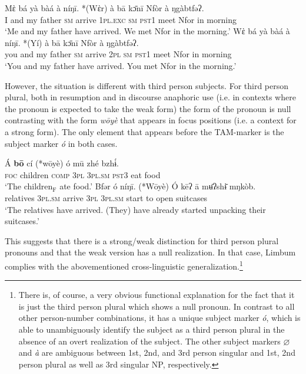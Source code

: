 \documentclass[output=paper]{langscibook}
\begin{document}
\ea\label{ex:johanneshein:discourseanaphora}
\begin{xlist}
\ex 
\gll Mὲ bá yà bàá à níŋī. *(Wὲr) à bā kɔ̄nī Nfòr à ŋgàbtfəʔ.\\
I and my father \textsc{sm} arrive \hphantom{*(}\textsc{1pl.exc} \textsc{sm} \textsc{pst1} meet Nfor in morning\\
\glt `Me and my father have arrived. We met Nfor in the morning.'
\ex 
\gll Wὲ bá yà bàá à níŋī. *(Yí) à bā kɔ̄nī Nfòr à ŋgàbtfəʔ.\\
you and my father \textsc{sm} arrive \hphantom{*(}\textsc{2pl} \textsc{sm} \textsc{pst1} meet Nfor in morning\\
\glt `You and my father have arrived. You met Nfor in the morning.'
\end{xlist}
\z
However, the situation is different with third person subjects. 
For third person plural, both in
resumption  and in discourse anaphoric use  (i.e. in contexts where the pronoun is expected to take the weak form) the form
of the pronoun is null contrasting with the form \textit{wōyè} that appears in focus positions (i.e. a context for a strong form). The only element that appears before the
TAM-marker is the subject marker \textit{ó} in both cases.

\ea
\begin{xlist}
\ex \label{ex:johanneshein:3rdpluralresumption}
\gll Á \textbf{bō} cí (*wōyè) ó mū zhé bzhɨ́.\\
\textsc{foc} children \textsc{comp} \hphantom{(*}\textsc{3pl} \textsc{3pl.sm} \textsc{pst3} eat food\\
\glt `The children$_{\text{F}}$ ate food.'
\ex \label{ex:johanneshein:3rdpluraldiscourse}
\gll Bfər ó níŋī. (*Wōyè) Ó kēʔ ā mʉ̄ʔshɨ̄ mŋkòb.\\
relatives \textsc{3pl.sm} arrive \hphantom{(*}\textsc{3pl} \textsc{3pl.sm} start to open suitcases\\
\glt `The relatives have arrived. (They) have already started unpacking their suitcases.'
\end{xlist}
\z
This suggests that there is a strong/weak distinction for third person plural pronouns and that the weak version has a null realization. In that case, Limbum complies with the abovementioned cross-linguistic generalization.\footnote{There is, of
  course, a very obvious functional explanation for the fact that it
  is just the third person plural which shows a null pronoun. In
  contrast to all other person-number combinations, it has a unique
  subject marker \textit{ó}, which is able to unambiguously identify
  the subject as a third person plural in the absence of an overt
  realization of the subject. The other subject markers $\varnothing$
  and \textit{à} are ambiguous between 1st, 2nd, and 3rd person
  singular and 1st, 2nd person plural as well as 3rd singular NP,
  respectively.}
\end{document}
